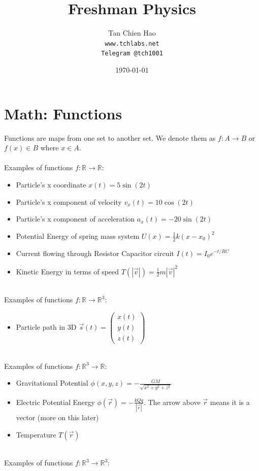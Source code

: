 \documentclass{article}
\title{Freshman Physics}
\author{
    Tan Chien Hao\\
    \texttt{www.tchlabs.net}\\
    \texttt{Telegram @tch1001}
}
\date{\today}
\begin{document}
\newif\ifpaper

\paperfalse 

\maketitle
\tableofcontents

\section{Math: Functions}
Functions are maps from one set to another set. We denote them as $f: A \rightarrow B$ or $f(x) \in B$ where $x\in A$. \\
\\
Examples of functions $f: \mathbb R \to \mathbb R$:
\begin{itemize}
    \item Particle's x coordinate $x(t) = 5 \sin (2t)$
    \item Particle's x component of velocity $v_x(t) = 10 \cos (2t)$
    \item Particle's x component of acceleration $a_x(t) = - 20 \sin (2t)$
    \item Potential Energy of spring mass system $U(x) = \frac{1}{2} k(x-x_0)^2$
    \item Current flowing through Resistor Capacitor circuit $I(t) = I_0 e^{-{t}/{RC}}$
    \item Kinetic Energy in terms of speed $T(|\vec{v}|) = \frac{1}{2} m |\vec{v}|^2$
\end{itemize}
\leavevmode \\
Examples of functions $f: \mathbb R \to \mathbb R^3$:
\begin{itemize}
    \item Particle path in 3D $\vec{s}(t) = \left(\begin{array}{l}
         x(t) \\
         y(t) \\
         z(t) 
    \end{array}\right) $
\end{itemize}
\leavevmode \\
Examples of functions $f: \mathbb R^3 \to \mathbb R$:

\begin{itemize}
    \item Gravitational Potential $\phi(x,y,z) = -\frac{GM}{\sqrt{x^2+y^2+z^2}}$
    \item Electric Potential Energy $\phi(\vec{r}) = -\frac{kQq}{|\vec{r}|}$. The arrow above $\vec{r}$ means it is a vector (more on this later)
    \item Temperature $T(\vec{r})$
\end{itemize}
\leavevmode \\
Examples of functions $f: \mathbb R^3 \to \mathbb R^3$:
\end{document}
